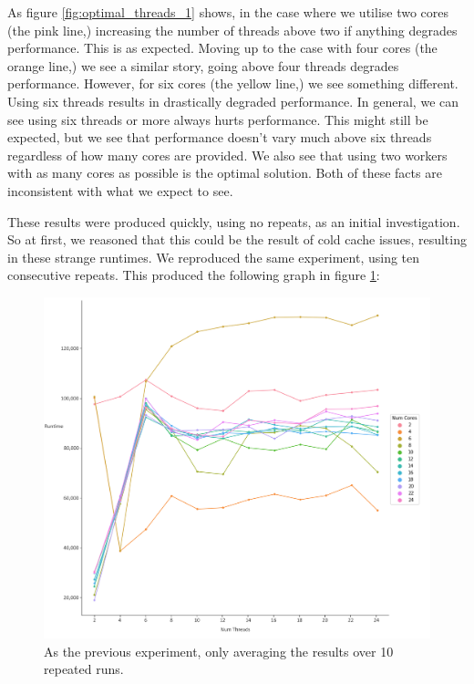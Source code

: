 As figure \ref{fig:optimal_threads_1} shows, in the case where we utilise two cores (the pink line,) increasing the number of threads above two if anything degrades performance. This is as expected. Moving up to the case with four cores (the orange line,) we see a similar story, going above four threads degrades performance. However, for six cores (the yellow line,) we see something different. Using six threads results in drastically degraded performance. In general, we can see using six threads or more always hurts performance. This might still be expected, but we see that performance doesn't vary much above six threads regardless of how many cores are provided. We also see that using two workers with as many cores as possible is the optimal solution. Both of these facts are inconsistent with what we expect to see.

These results were produced quickly, using no repeats, as an initial investigation. So at first, we reasoned that this could be the result of cold cache issues, resulting in these strange runtimes. We reproduced the same experiment, using ten consecutive repeats. This produced the following graph in figure \ref{fig:optimal_threads_1_(repeats)}:



\begin{figure}[H]
    \includegraphics[width=1\textwidth]{graphics/optimal_threads_1_(repeats).png}
    \caption{As the previous experiment, only averaging the results over 10 repeated runs.}
    \label{fig:optimal_threads_1_(repeats)}
\end{figure}



